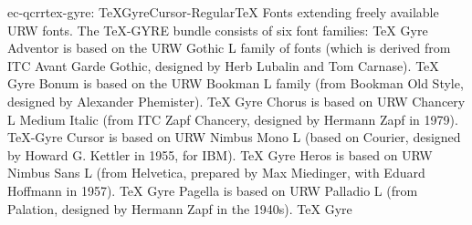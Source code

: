 \documentclass{ddltxtyp}
\begin{document}
\begin{package}{ec-qcrr}{tex-gyre: TeXGyreCursor-Regular}{{\TeX} Fonts extending freely available URW fonts.}
The {\TeX}-GYRE bundle consists of six font families: {\TeX} Gyre
Adventor is based on the URW Gothic L family of fonts (which is
derived from ITC Avant Garde Gothic, designed by Herb Lubalin
and Tom Carnase). {\TeX} Gyre Bonum is based on the URW Bookman L
family (from Bookman Old Style, designed by Alexander
Phemister). {\TeX} Gyre Chorus is based on URW Chancery L Medium
Italic (from ITC Zapf Chancery, designed by Hermann Zapf in
1979). {\TeX}-Gyre Cursor is based on URW Nimbus Mono L (based on
Courier, designed by Howard G. Kettler in 1955, for IBM). {\TeX}
Gyre Heros is based on URW Nimbus Sans L (from Helvetica,
prepared by Max Miedinger, with Eduard Hoffmann in 1957). {\TeX}
Gyre Pagella is based on URW Palladio L (from Palation,
designed by Hermann Zapf in the 1940s). {\TeX} Gyre %
\end{package}
\end{document}
